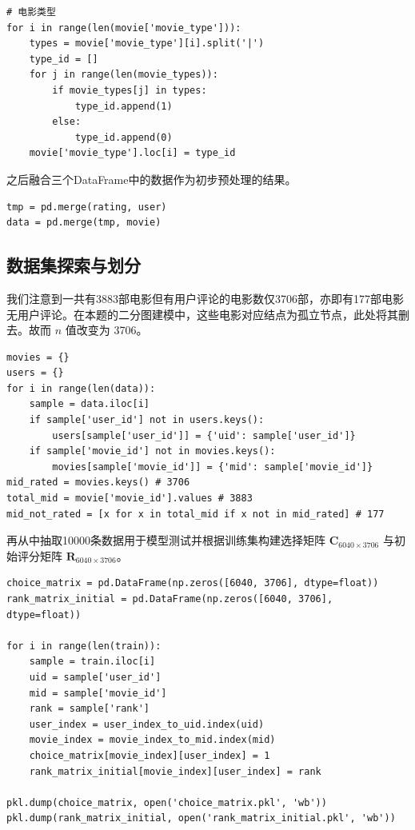 \begin{spacing}{1.5}
\begin{lstlisting}
# 电影类型
for i in range(len(movie['movie_type'])):
    types = movie['movie_type'][i].split('|')
    type_id = []
    for j in range(len(movie_types)):
        if movie_types[j] in types:
            type_id.append(1)
        else:
            type_id.append(0)
    movie['movie_type'].loc[i] = type_id
\end{lstlisting}\par
之后融合三个DataFrame中的数据作为初步预处理的结果。
\begin{lstlisting}
tmp = pd.merge(rating, user)
data = pd.merge(tmp, movie)
\end{lstlisting}
\par
\subsection{数据集探索与划分}
我们注意到一共有3883部电影但有用户评论的电影数仅3706部，亦即有177部电影无用户评论。在本题的二分图建模中，这些电影对应结点为孤立节点，此处将其删去。故而 $n$ 值改变为 3706。
\begin{lstlisting}
movies = {}
users = {}
for i in range(len(data)):
    sample = data.iloc[i]
    if sample['user_id'] not in users.keys():
        users[sample['user_id']] = {'uid': sample['user_id']}
    if sample['movie_id'] not in movies.keys():
        movies[sample['movie_id']] = {'mid': sample['movie_id']}
mid_rated = movies.keys() # 3706
total_mid = movie['movie_id'].values # 3883
mid_not_rated = [x for x in total_mid if x not in mid_rated] # 177
\end{lstlisting}\par
再从中抽取10000条数据用于模型测试并根据训练集构建选择矩阵 $\mathbf{C}_{6040\times 3706}$ 与初始评分矩阵 $\mathbf{R}_{6040\times 3706}$。
\begin{lstlisting}
choice_matrix = pd.DataFrame(np.zeros([6040, 3706], dtype=float))
rank_matrix_initial = pd.DataFrame(np.zeros([6040, 3706], dtype=float))

for i in range(len(train)):
    sample = train.iloc[i]
    uid = sample['user_id']
    mid = sample['movie_id']
    rank = sample['rank']
    user_index = user_index_to_uid.index(uid)
    movie_index = movie_index_to_mid.index(mid)
    choice_matrix[movie_index][user_index] = 1
    rank_matrix_initial[movie_index][user_index] = rank

pkl.dump(choice_matrix, open('choice_matrix.pkl', 'wb'))
pkl.dump(rank_matrix_initial, open('rank_matrix_initial.pkl', 'wb'))
\end{lstlisting}\par


\end{spacing}
